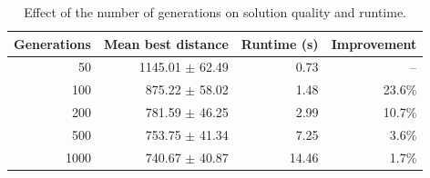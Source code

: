 \begin{table}[h]
\centering
\caption{Effect of the number of generations on solution quality and runtime.}
\label{tab:experiment-c}
\begin{tabular}{rrrr}
\hline
Generations & Mean best distance & Runtime (s) & Improvement \\
\hline
50 & 1145.01 $\pm$ 62.49 & 0.73 & -- \\
100 & 875.22 $\pm$ 58.02 & 1.48 & 23.6\% \\
200 & 781.59 $\pm$ 46.25 & 2.99 & 10.7\% \\
500 & 753.75 $\pm$ 41.34 & 7.25 & 3.6\% \\
1000 & 740.67 $\pm$ 40.87 & 14.46 & 1.7\% \\
\hline
\end{tabular}
\end{table}
